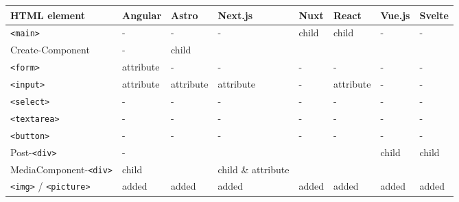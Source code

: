 \documentclass[a4paper, 12pt]{article}
\begin{document}
\begin{table}[!ht]
  \centering
  \begin{adjustbox}{angle=90}
    \begin{tabular}{|l|l|l|l|l|l|l|l|}
      \hline
      \textbf{HTML element}           & \textbf{Angular}  & \textbf{Astro}  & \textbf{Next.js}    & \textbf{Nuxt} & \textbf{React}  & \textbf{Vue.js} & \textbf{Svelte} \\ \hline
      \verb|<main>|                   & -                 & -               & -                   & child         & child           & -               & -               \\ \hline
      Create-Component                & -                 & child           & ~                   & ~             & ~               & ~               & ~               \\ \hline
      \verb|<form>|                   & attribute         & -               & -                   & -             & -               & -               & -               \\ \hline
      \verb|<input>|                  & attribute         & attribute       & attribute           & -             & attribute       & -               & -               \\ \hline
      \verb|<select>|                 & -                 & -               & -                   & -             & -               & -               & -               \\ \hline
      \verb|<textarea>|               & -                 & -               & -                   & -             & -               & -               & -               \\ \hline
      \verb|<button>|                 & -                 & -               & -                   & -             & -               & -               & -               \\ \hline
      Post-\verb|<div>|               & -                 & ~               & ~                   & ~             & ~               & child           & child           \\ \hline
      MediaComponent-\verb|<div>|     & child             & ~               & child \& attribute  & ~             & ~               & ~               & ~               \\ \hline
      \verb|<img>| / \verb|<picture>| & added             & added           & added               & added         & added           & added           & added           \\ \hline

\end{tabular}
\end{adjustbox}
\end{table}
\end{document}
